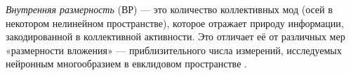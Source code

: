 \textit{Внутренняя размерность} (ВР) — это количество коллективных мод (осей в некотором нелинейном пространстве), которое отражает природу информации, закодированной в коллективной активности. Это отличает её от различных мер «размерности вложения» — приблизительного числа измерений, исследуемых нейронным многообразием в евклидовом пространстве \cite{Jazayeri2021}.

